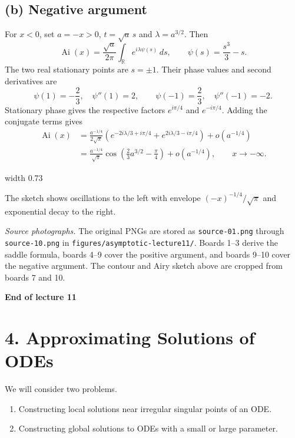 \documentclass[11pt,a4paper]{article}
\begin{document}
\clearpage
\subsection*{(b) Negative argument}
For $x<0$, set $a=-x>0$, $t=\sqrt a\,s$ and $\lambda=a^{3/2}$. Then
\[
    \operatorname{Ai}(x)=\frac{\sqrt a}{2\pi}
        \int_{\mathbb R}e^{i\lambda\psi(s)}\,ds,\qquad
    \psi(s)=\frac{s^3}{3}-s.
\]
The two real stationary points are $s=\pm1$. Their phase values
and second derivatives are
\[
    \psi(1)=-\frac23,\quad \psi''(1)=2,\qquad
    \psi(-1)=\frac23,\quad \psi''(-1)=-2.
\]
Stationary phase gives the respective factors $e^{i\pi/4}$ and
$e^{-i\pi/4}$. Adding the conjugate terms gives
\begin{align*}
    \operatorname{Ai}(x)
    &=\frac{a^{-1/4}}{2\sqrt\pi}
        \left(e^{-2i\lambda/3+i\pi/4}
             +e^{2i\lambda/3-i\pi/4}\right)+o(a^{-1/4})\\
    &=\frac{a^{-1/4}}{\sqrt\pi}
        \cos\!\left(\frac23a^{3/2}-\frac{\pi}{4}\right)
        +o(a^{-1/4}),\qquad x\to-\infty.
\end{align*}
\begin{center}
    \pdfximage width 0.73\linewidth {figures/asymptotic-lecture11/airy-function-sketch.png}
    \leavevmode\pdfrefximage\pdflastximage
\end{center}
\noindent The sketch shows oscillations to the left with envelope
$(-x)^{-1/4}/\sqrt{\pi}$ and exponential decay to the right.

\medskip
\noindent\textit{Source photographs.}
The original PNGs are stored as \texttt{source-01.png} through
\texttt{source-10.png} in \texttt{figures/asymptotic-lecture11/}.
Boards 1--3 derive the saddle formula, boards 4--9 cover the positive
argument, and boards 9--10 cover the negative argument. The contour
and Airy sketch above are cropped from boards 7 and 10.

\begin{center}
    \textbf{End of lecture 11}
\end{center}

\clearpage
\section*{4. Approximating Solutions of ODEs}

We will consider two problems.
\begin{enumerate}
    \item Constructing local solutions near irregular singular points of an ODE.
    \item Constructing global solutions to ODEs with a small or large parameter.
\end{enumerate}
\end{document}
